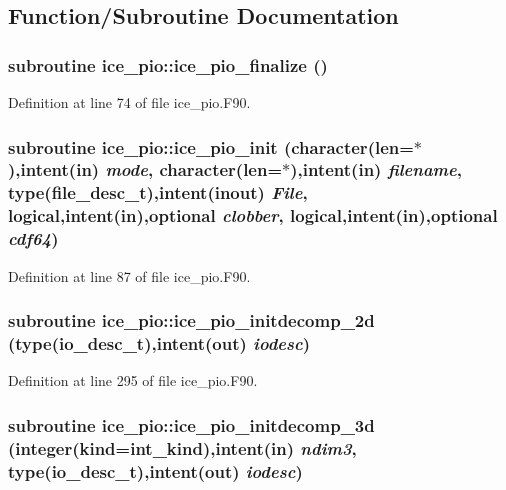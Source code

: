 \subsection{Function/Subroutine Documentation}
\hypertarget{namespaceice__pio_a82e41ef2d2fdafcbd23064613f27c5f1}{
\subsubsection[{ice\_\-pio\_\-finalize}]{\setlength{\rightskip}{0pt plus 5cm}subroutine ice\_\-pio::ice\_\-pio\_\-finalize ()}}
\label{namespaceice__pio_a82e41ef2d2fdafcbd23064613f27c5f1}


Definition at line 74 of file ice\_\-pio.F90.\hypertarget{namespaceice__pio_a14b08b2f773c9970e0938770ad4746e2}{
\subsubsection[{ice\_\-pio\_\-init}]{\setlength{\rightskip}{0pt plus 5cm}subroutine ice\_\-pio::ice\_\-pio\_\-init (character(len=$\ast$),intent(in) {\em mode}, \/  character(len=$\ast$),intent(in) {\em filename}, \/  type(file\_\-desc\_\-t),intent(inout) {\em File}, \/  logical,intent(in),optional {\em clobber}, \/  logical,intent(in),optional {\em cdf64})}}
\label{namespaceice__pio_a14b08b2f773c9970e0938770ad4746e2}


Definition at line 87 of file ice\_\-pio.F90.\hypertarget{namespaceice__pio_abd0ade136046f0940881df9f9d8c85f3}{
\subsubsection[{ice\_\-pio\_\-initdecomp\_\-2d}]{\setlength{\rightskip}{0pt plus 5cm}subroutine ice\_\-pio::ice\_\-pio\_\-initdecomp\_\-2d (type(io\_\-desc\_\-t),intent(out) {\em iodesc})}}
\label{namespaceice__pio_abd0ade136046f0940881df9f9d8c85f3}


Definition at line 295 of file ice\_\-pio.F90.\hypertarget{namespaceice__pio_ad58ca6d958a4735d1709586ad6fde92c}{
\subsubsection[{ice\_\-pio\_\-initdecomp\_\-3d}]{\setlength{\rightskip}{0pt plus 5cm}subroutine ice\_\-pio::ice\_\-pio\_\-initdecomp\_\-3d (integer(kind=int\_\-kind),intent(in) {\em ndim3}, \/  type(io\_\-desc\_\-t),intent(out) {\em iodesc})}}
\label{namespaceice__pio_ad58ca6d958a4735d1709586ad6fde92c}


